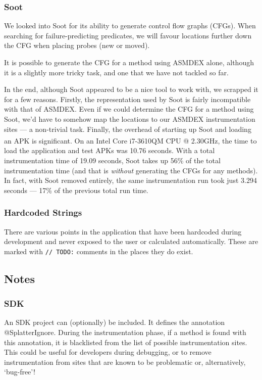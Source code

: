\subsubsection{Soot}

We looked into Soot for its ability to generate control flow graphs (CFGs). When
searching for failure-predicting predicates, we will favour locations further
down the CFG when placing probes (new or moved).

It is possible to generate the CFG for a method using ASMDEX alone, although it
is a slightly more tricky task, and one that we have not tackled so far.

In the end, although Soot appeared to be a nice tool to work with, we scrapped
it for a few reasons. Firstly, the representation used by Soot is fairly
incompatible with that of ASMDEX. Even if we could determine the CFG for a
method using Soot, we'd have to somehow map the locations to our ASMDEX
instrumentation sites --- a non-trivial task. Finally, the overhead of starting
up Soot and loading an APK is significant. On an
Intel\textsuperscript{\textregistered} Core\textsuperscript{\texttrademark}
i7-3610QM CPU @ 2.30GHz, the time to load the application and test APKs was
10.76 seconds. With a total instrumentation time of 19.09 seconds, Soot takes up
56\% of the total instrumentation time (and that is \textit{without} generating
the CFGs for any methods). In fact, with Soot removed entirely, the same
instrumentation run took just 3.294 seconds --- 17\% of the previous total run
time.

\subsubsection{Hardcoded Strings}

There are various points in the application that have been hardcoded during
development and never exposed to the user or calculated automatically. These are
marked with \texttt{// TODO:} comments in the places they do exist.

\subsection{Notes}

\subsubsection{SDK}
\label{sec:sec:splatter_sdk}

An SDK project can (optionally) be included. It defines the annotation
@SplatterIgnore. During the instrumentation phase, if a method is found with
this annotation, it is blacklisted from the list of possible instrumentation
sites. This could be useful for developers during debugging, or to remove
instrumentation from sites that are known to be problematic or, alternatively,
{\lq}bug-free{\rq}!

